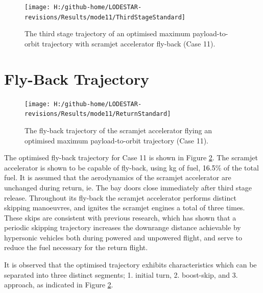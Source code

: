 \begin{figure}[ht!]%
\centering
\texttt{[image: H:/github-home/LODESTAR-revisions/Results/mode11/ThirdStageStandard]}
\caption{The third stage trajectory of an optimised maximum payload-to-orbit trajectory with scramjet accelerator fly-back (Case 11). }
\label{fig:ThirdStageStandard}
\end{figure}


\section{Fly-Back Trajectory}

\begin{figure}[ht!] %
	\centering
	\texttt{[image: H:/github-home/LODESTAR-revisions/Results/mode11/ReturnStandard]}
	\caption{The fly-back trajectory of the scramjet accelerator flying an optimised maximum payload-to-orbit trajectory (Case 11). }
	\label{fig:ReturnStandard}
\end{figure}

The optimised fly-back trajectory for Case 11 is shown in Figure \ref{fig:ReturnStandard}.
The scramjet accelerator is shown to be capable of fly-back, using \returnFuelStandard kg of fuel, \textcolor{black}{16.5}\% of the total fuel. It is assumed that the aerodynamics of the scramjet accelerator are unchanged during return, ie. The bay doors close immediately after third stage release. 
Throughout its fly-back the scramjet accelerator performs distinct skipping manoeuvres, and ignites the scramjet engines a total of three times. 
These skips are consistent with previous research, which has shown that a periodic skipping trajectory increases the downrange distance achievable by hypersonic vehicles both during powered and unpowered flight\cite{Moshman2014,Darby2011,Toso2015,Tetlow1992,Eggers1957,Kanda2007,Chai2015}, and serve to reduce the fuel necessary for the return flight. 

It is observed that the optimised trajectory exhibits characteristics which can be separated into three distinct segments; 1. initial turn, 2. boost-skip, and 3. approach, as indicated in Figure \ref{fig:ReturnStandard}. 
 
